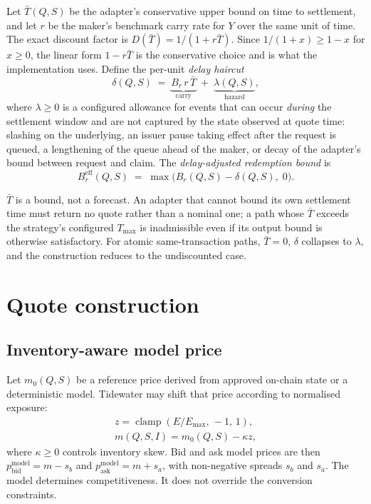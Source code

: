 \documentclass[10pt,twocolumn]{article}
\theoremstyle{definition}
\newcommand{\Br}{B_{r}}
\newcommand{\Bre}{B_{r}^{\mathrm{eff}}}
\begin{document}
Let $\bar{T}(Q,S)$ be the adapter's conservative upper bound on time to settlement, and let $r$ be the maker's
benchmark carry rate for $Y$ over the same unit of time. The exact discount factor is
$D(\bar T) = 1/(1 + r\bar{T})$. Since $1/(1+x) \ge 1 - x$ for $x \ge 0$, the linear form
$1 - r\bar{T}$ is the conservative choice and is what the implementation uses. Define the per-unit
\emph{delay haircut}
\begin{equation}
  \delta(Q,S) \;=\; \underbrace{\Br\, r\, \bar{T}}_{\text{carry}}
                 \;+\; \underbrace{\lambda(Q,S)}_{\text{hazard}},
\end{equation}
where $\lambda \ge 0$ is a configured allowance for events that can occur \emph{during} the settlement window and
are not captured by the state observed at quote time: slashing on the underlying, an issuer pause taking effect
after the request is queued, a lengthening of the queue ahead of the maker, or decay of the adapter's bound
between request and claim. The \emph{delay-adjusted redemption bound} is
\begin{equation}
  \Bre(Q,S) \;=\; \max\!\big(\Br(Q,S) - \delta(Q,S),\; 0\big).
\end{equation}

$\bar{T}$ is a bound, not a forecast. An adapter that cannot bound its own settlement time must return no quote
rather than a nominal one; a path whose $\bar{T}$ exceeds the strategy's configured $T_{\max}$ is inadmissible even
if its output bound is otherwise satisfactory. For atomic same-transaction paths, $\bar T = 0$, $\delta$ collapses
to $\lambda$, and the construction reduces to the undiscounted case.

\section{Quote construction}

\subsection{Inventory-aware model price}

Let $m_0(Q,S)$ be a reference price derived from approved on-chain state or a deterministic model. Tidewater may
shift that price according to normalised exposure:
\begin{gather*}
  z = \operatorname{clamp}(E/E_{\max},\,-1,\,1),\\
  m(Q,S,I) = m_0(Q,S) - \kappa z,
\end{gather*}
where $\kappa \ge 0$ controls inventory skew. Bid and ask model prices are then
$p^{\mathrm{model}}_{\mathrm{bid}} = m - s_b$ and $p^{\mathrm{model}}_{\mathrm{ask}} = m + s_a$, with
non-negative spreads $s_b$ and $s_a$. The model determines competitiveness. It does not override the conversion
constraints.
\end{document}

